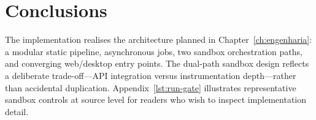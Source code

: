 \section{Conclusions}

The implementation realises the architecture planned in Chapter~\ref{ch:engenharia}: a modular static
pipeline, asynchronous jobs, two sandbox orchestration paths, and converging web/desktop entry points.
The dual-path sandbox design reflects a deliberate trade-off---API integration versus instrumentation
depth---rather than accidental duplication. Appendix~\ref{lst:run-gate} illustrates representative
sandbox controls at source level for readers who wish to inspect implementation detail.
